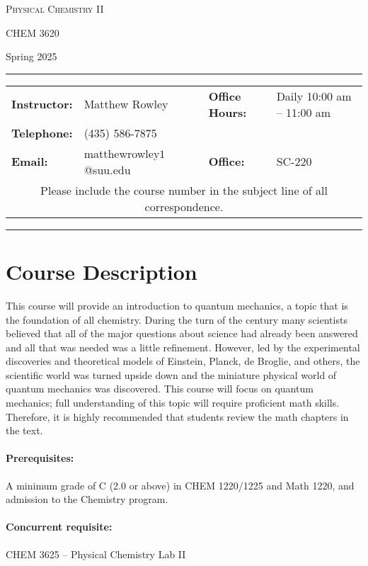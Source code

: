 \documentclass[12pt, letterpaper]{article}
\begin{document}
\begin{center}
	{\Large \textsc{Physical Chemistry II}}

	CHEM 3620
\end{center}

\begin{center}
	{\large Spring 2025}
\end{center}
\begin{center}
	\rule{0.99\textwidth}{0.4pt}
	\begin{tabular}{llcll}
		\textbf{Instructor:} & Matthew Rowley           &  & \textbf{Office Hours:} & Daily 10:00 am -- 11:00 am \\
		\textbf{Telephone:}  & (435) 586-7875           &  &                        &                            \\
		\textbf{Email:}      & matthewrowley$1$@suu.edu &  & \textbf{Office:}       & SC-220                     \\
		\multicolumn{5}{c}{Please include the course number in the subject line of all correspondence.}
	\end{tabular}
	\rule{0.99\textwidth}{0.4pt}
\end{center}


\section*{Course Description}
This course will provide an introduction to quantum mechanics, a topic that is the foundation of all chemistry. During the turn of the  century many scientists believed that all of the major questions about science had already been answered and all that was needed was a little refinement. However, led by the experimental discoveries and theoretical models of Einstein, Planck, de Broglie, and others, the scientific world was turned upside down and the miniature physical world of quantum mechanics was discovered. This course will focus on quantum mechanics; full understanding of this topic will require proficient math skills. Therefore, it is highly recommended that students review the math chapters in the text.

\paragraph{Prerequisites:}
A minimum grade of C (2.0 or above) in CHEM 1220/1225 and Math 1220, and admission to the Chemistry program.

\paragraph{Concurrent requisite:}
CHEM 3625 -- Physical Chemistry Lab II
\end{document}
